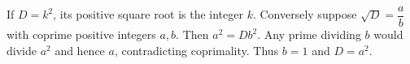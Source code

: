 If $D=k^2$, its positive square root is the integer $k$. Conversely suppose $\sqrt D=\dfrac{a}{b}$ with coprime positive integers $a,b$. Then $a^2=Db^2$. Any prime dividing $b$ would divide $a^2$ and hence $a$, contradicting coprimality. Thus $b=1$ and $D=a^2$.
